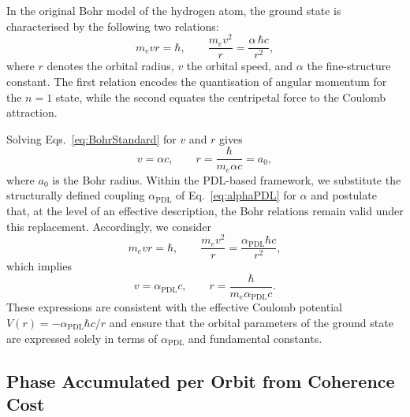 \documentclass[11pt,a4paper]{article}
\begin{document}
In the original Bohr model of the hydrogen atom, the ground state is characterised by the following two relations:\cite{Laubscher2026SchrodingerPDL}
\begin{equation}
m_e v r = \hbar, \qquad \frac{m_e v^{2}}{r} = \frac{\alpha\,\hbar c}{r^{2}},
\label{eq:BohrStandard}
\end{equation}
where $r$ denotes the orbital radius, $v$ the orbital speed, and $\alpha$ the fine-structure constant. The first relation encodes the quantisation of angular momentum for the $n=1$ state, while the second equates the centripetal force to the Coulomb attraction.\par Solving Eqs.~\eqref{eq:BohrStandard} for $v$ and $r$ gives
\begin{equation}
v = \alpha c, \qquad r = \frac{\hbar}{m_e \alpha c} = a_0,
\label{eq:BohrSolutions}
\end{equation}
where $a_0$ is the Bohr radius. Within the PDL-based framework, we substitute the structurally defined coupling $\alpha_{\mathrm{PDL}}$ of Eq.~\eqref{eq:alphaPDL} for $\alpha$ and postulate that, at the level of an effective description, the Bohr relations remain valid under this replacement. Accordingly, we consider
\begin{equation}
m_e v r = \hbar, \qquad \frac{m_e v^{2}}{r} = \frac{\alpha_{\mathrm{PDL}}\hbar c}{r^{2}},
\label{eq:BohrPDL}
\end{equation}
which implies
\begin{equation}
v = \alpha_{\mathrm{PDL}} c, \qquad r = \frac{\hbar}{m_e \alpha_{\mathrm{PDL}} c}.
\label{eq:BohrPDLSolutions}
\end{equation}
These expressions are consistent with the effective Coulomb potential $V(r) = -\alpha_{\mathrm{PDL}}\hbar c/r$ and ensure that the orbital parameters of the ground state are expressed solely in terms of $\alpha_{\mathrm{PDL}}$ and fundamental constants.

\subsection{Phase Accumulated per Orbit from Coherence Cost}
\end{document}
